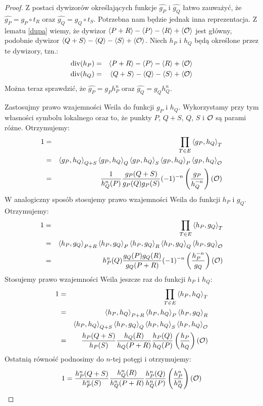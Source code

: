 \begin{proof}
Z postaci dywizorów określających funkcje $\widehat{g_P}$ i $\widehat{g_Q}$
łatwo zauważyć,
że $\widehat{g_P} = g_P \circ t_R$ oraz $\widehat{g_Q} = g_Q \circ t_S$.
Potrzebna nam będzie jednak inna reprezentacja.
Z lematu \ref{dupa} wiemy,
że dywizor $\left\langle P+R\right\rangle - \left\langle P\right\rangle - \left\langle R\right\rangle + \left\langle\mathcal{O}\right\rangle$ jest główny,
podobnie dywizor $\left\langle Q+S\right\rangle - \left\langle Q\right\rangle - \left\langle S\right\rangle + \left\langle\mathcal{O}\right\rangle$.
Niech $h_P$ i $h_Q$ będą określone przez te dywizory, tzn.:
\begin{eqnarray*}
\operatorname{div}(h_P) & = & \left\langle P+R\right\rangle - \left\langle P\right\rangle - \left\langle R\right\rangle + \left\langle\mathcal{O}\right\rangle \\
\operatorname{div}(h_Q) & = & \left\langle Q+S\right\rangle - \left\langle Q\right\rangle - \left\langle S\right\rangle + \left\langle\mathcal{O}\right\rangle
\end{eqnarray*}
Można teraz sprawdzić,
że $\widehat{g_P} = g_Ph_P^n$ oraz $\widehat{g_Q} = g_Qh_Q^n$.

Zastosujmy prawo wzajemności Weila do funkcji $g_P$ i $h_Q$.
Wykorzystamy przy tym własności symbolu lokalnego
oraz to, że punkty $P$, $Q+S$, $Q$, $S$ i $\mathcal{O}$ są parami różne.
Otrzymujemy:
\begin{eqnarray}
1
& = & \prod_{T \in E} \left\langle g_P , h_Q \right\rangle_{T}
\nonumber \\
& = & \left\langle g_P , h_Q \right\rangle_{Q+S}\left\langle g_P , h_Q \right\rangle_{Q}\left\langle g_P , h_Q \right\rangle_{S}
      \left\langle g_P , h_Q \right\rangle_{P}\left\langle g_P , h_Q \right\rangle_{\mathcal{O}}
\nonumber \\
& = & \frac{1}{h_Q^n(P)}\frac{g_P(Q+S)}{g_P(Q)g_P(S)}
      (-1)^{-n}\left(\frac{g_P}{h_Q^{-n}}\right)(\mathcal{O})
\end{eqnarray}
W analogiczny sposób stosujemy prawo wzajemności Weila do funkcji
$h_P$ i $g_Q$. Otrzymujemy:
\begin{eqnarray}
1
& = & \prod_{T \in E} \left\langle h_P , g_Q \right\rangle_{T} \nonumber \\
& = & \left\langle h_P , g_Q \right\rangle_{P+R}\left\langle h_P , g_Q \right\rangle_{P}\left\langle h_P , g_Q \right\rangle_{R}
      \left\langle h_P , g_Q \right\rangle_{Q}\left\langle h_P , g_Q \right\rangle_{\mathcal{O}} \nonumber \\
& = & h_P^n(Q)\frac{g_Q(P)g_Q(R)}{g_Q(P+R)}
      (-1)^{-n}\left(\frac{h_P^{-n}}{g_Q}\right)(\mathcal{O})
\end{eqnarray}
Stosujemy prawo wzajemności Weila jeszcze raz do funkcji $h_P$ i $h_Q$:
\begin{eqnarray}
1
& = & \prod_{T \in E} \left\langle h_P , h_Q \right\rangle_{T}
\nonumber \\
& = & \left\langle h_P , h_Q \right\rangle_{P+R}
      \left\langle h_P , h_Q \right\rangle_{P}
      \left\langle h_P , g_Q \right\rangle_{R}
\nonumber \\
&   & \left\langle h_P , h_Q \right\rangle_{Q+S}
      \left\langle h_P , g_Q \right\rangle_{Q}
      \left\langle h_P , h_Q \right\rangle_{S}
      \left\langle h_P , h_Q \right\rangle_{\mathcal{O}}
\nonumber \\
& = & \frac{h_P(Q+S)}{h_P(S)}
      \frac{h_Q(R)}{h_Q(P+R)}
      \frac{h_P(Q)}{h_Q(P)}
      \left(\frac{h_P}{h_Q}\right)(\mathcal{O})
\end{eqnarray}
Ostatnią równość podnosimy do $n$-tej potęgi i otrzymujemy:
\begin{equation}
1 =
\frac{h_P^n(Q+S)}{h_P^n(S)}
\frac{h_Q^n(R)}{h_Q^n(P+R)}
\frac{h_P^n(Q)}{h_Q^n(P)}
\left(\frac{h_P^n}{h_Q^n}\right)(\mathcal{O})
\end{equation}


\end{proof}
